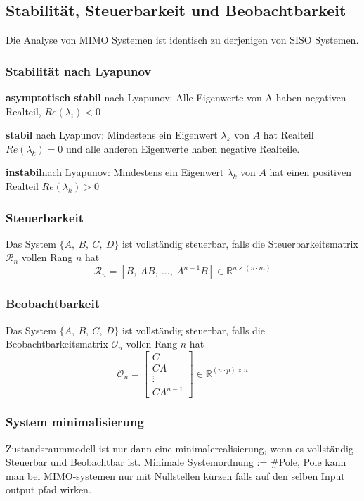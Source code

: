 \subsection{Stabilität, Steuerbarkeit und Beobachtbarkeit}
    Die Analyse von MIMO Systemen ist identisch zu derjenigen von SISO Systemen. 
    \subsubsection{Stabilität nach Lyapunov}
    \textbf{asymptotisch stabil} nach Lyapunov: 
    Alle Eigenwerte von A haben negativen Realteil, $Re(\lambda_i) < 0$
    
    \textbf{stabil} nach Lyapunov:
    Mindestens ein Eigenwert $\lambda_k$ von $A$ hat Realteil $Re(\lambda_k) = 0$ und alle anderen Eigenwerte haben negative Realteile.
    
    \textbf{instabil}nach Lyapunov:
    Mindestens ein Eigenwert $\lambda_k$ von $A$ hat einen positiven Realteil $Re(\lambda_k) > 0$
    
    \subsubsection{Steuerbarkeit}
        Das System $\{A,\ B,\ C,\ D\}$ ist vollständig steuerbar, falls die Steuerbarkeitsmatrix $\mathcal{R}_n$ vollen Rang $n$ hat
    \[\mathcal{R}_n = [B,\ AB,\ \dots,\ A^{n-1}B]\in \mathbb{R}^{n\times(n\cdot m)}\]
    
    \subsubsection{Beobachtbarkeit}
        Das System $\{A,\ B,\ C,\ D\}$ ist vollständig steuerbar, falls die Beobachtbarkeitsmatrix $\mathcal{O}_n$ vollen Rang $n$ hat
        \[\mathcal{O}_n = \begin{bmatrix} C\\ CA\\ \vdots\\ CA^{n-1}\end{bmatrix}\in \mathbb{R}^{(n\cdot p)\times n}\]
    \subsubsection{System minimalisierung}
        Zustandsraummodell ist nur dann eine minimalerealisierung, wenn es vollständig Steuerbar und Beobachtbar ist.
        Minimale Systemordnung := #Pole, Pole kann man bei MIMO-systemen nur mit Nullstellen kürzen falls auf den selben Input output pfad wirken.
        
        
